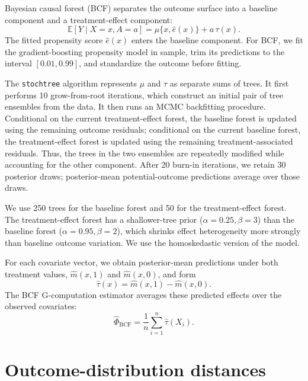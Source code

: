 Bayesian causal forest (BCF) \cite{hahnBayesianRegressionTree2020} separates the outcome surface into a baseline component and a treatment-effect component:
\[
\mathbb E[Y\mid X=x,A=a]
=
\mu\{x,\widehat e(x)\}
+
a\,\tau(x).
\]
The fitted propensity score \(\widehat e(x)\) enters the baseline component. For BCF, we fit the gradient-boosting propensity model in sample, trim its predictions to the interval \([0.01,0.99]\), and standardize the outcome before fitting.

The \texttt{stochtree} algorithm represents \(\mu\) and \(\tau\) as separate sums of trees. It first performs 10 grow-from-root iterations, which construct an initial pair of tree ensembles from the data. It then runs an MCMC backfitting procedure. Conditional on the current treatment-effect forest, the baseline forest is updated using the remaining outcome residuals; conditional on the current baseline forest, the treatment-effect forest is updated using the remaining treatment-associated residuals. Thus, the trees in the two ensembles are repeatedly modified while accounting for the other component. After 20 burn-in iterations, we retain 30 posterior draws; posterior-mean potential-outcome predictions average over those draws.

We use 250 trees for the baseline forest and 50 for the treatment-effect forest. The treatment-effect forest has a shallower-tree prior (\(\alpha=0.25,\beta=3\)) than the baseline forest (\(\alpha=0.95,\beta=2\)), which shrinks effect heterogeneity more strongly than baseline outcome variation. We use the homoskedastic version of the model.

For each covariate vector, we obtain posterior-mean predictions under both treatment values, \(\widehat m(x,1)\) and \(\widehat m(x,0)\), and form
\[
\widehat\tau(x)=\widehat m(x,1)-\widehat m(x,0).
\]
The BCF G-computation estimator averages these predicted effects over the observed covariates:
\[
\widehat{\Phi}_{\mathrm{BCF}}
=
\frac{1}{n}
\sum_{i=1}^{n}
\widehat\tau(X_i).
\]

\clearpage
\section{Outcome-distribution distances}
\label{app:distances}

